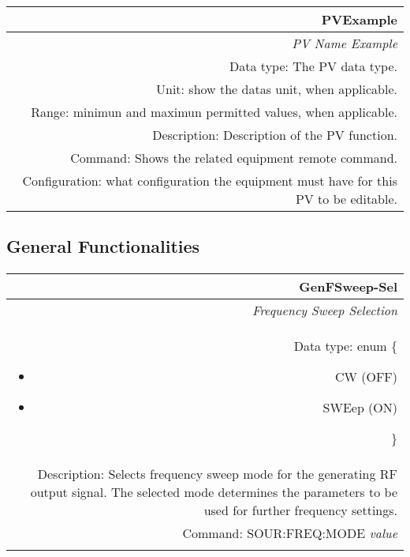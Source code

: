 \documentclass[openany]{article}
\begin{document}
		\newcommand{\FuncTableBorderColor}{gray!50} %
		\newcommand{\nofunc}{\cellcolor{gray!20}\color{gray}} %
		\newcommand{\yesfunc}{\cellcolor{white}\color{black}} %

		\bigskip
		\begin{tabular}{N}
			\hline
			\bfseries PVExample \\ \hline
			\emph{PV Name Example} \\
			Data type: The PV data type. \\
			Unit: show the datas unit, when applicable. \\
			Range: minimun and maximun permitted values, when applicable. \\
			Description: Description of the PV function. \\
			Command: Shows the related equipment remote command. \\
			Configuration: what configuration the equipment must have for this PV to be editable. \\

		\end{tabular}


	\subsection{General Functionalities}\label{pvgroup:function}
		

		\paragraph{} %


		\begin{tabular}{N}
			\hline
			\bfseries GenFSweep-Sel \\ \hline
			\emph{Frequency Sweep Selection} \\
			Data type: enum \{\begin{itemize}[noitemsep]
				\small
				\item[] CW (OFF)
				\item[] SWEep (ON)
			\end{itemize}\} \\
			Description: Selects frequency sweep mode for the generating RF output signal. The selected mode determines the parameters to be used for further frequency settings. \\
			Command: SOUR:FREQ:MODE \emph{value} \\
			\\

		\end{tabular}
\end{document}
